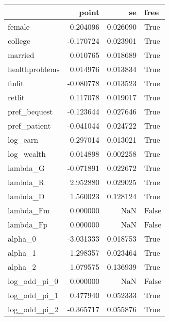 \begin{tabular}{lrrl}
\toprule
{} &     point &        se &   free \\
\midrule
female         & -0.204096 &  0.026090 &   True \\
college        & -0.170724 &  0.023901 &   True \\
married        &  0.010765 &  0.018689 &   True \\
healthproblems &  0.014976 &  0.013834 &   True \\
finlit         & -0.080778 &  0.013523 &   True \\
retlit         &  0.117078 &  0.019017 &   True \\
pref\_bequest   & -0.123644 &  0.027646 &   True \\
pref\_patient   & -0.041044 &  0.024722 &   True \\
log\_earn       & -0.297014 &  0.013021 &   True \\
log\_wealth     &  0.014898 &  0.002258 &   True \\
lambda\_G       & -0.071891 &  0.022672 &   True \\
lambda\_R       &  2.952880 &  0.029025 &   True \\
lambda\_D       &  1.560023 &  0.128124 &   True \\
lambda\_Fm      &  0.000000 &       NaN &  False \\
lambda\_Fp      &  0.000000 &       NaN &  False \\
alpha\_0        & -3.031333 &  0.018753 &   True \\
alpha\_1        & -1.298357 &  0.023464 &   True \\
alpha\_2        &  1.079575 &  0.136939 &   True \\
log\_odd\_pi\_0   &  0.000000 &       NaN &  False \\
log\_odd\_pi\_1   &  0.477940 &  0.052333 &   True \\
log\_odd\_pi\_2   & -0.365717 &  0.055876 &   True \\
\bottomrule
\end{tabular}

